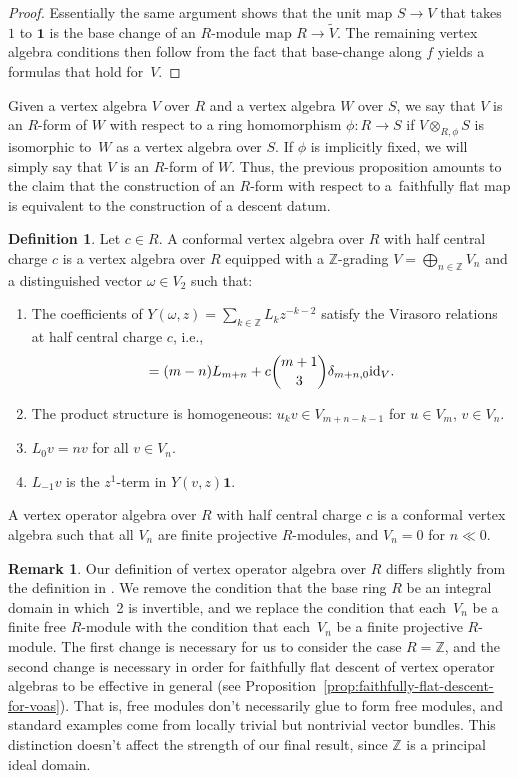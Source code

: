\documentclass[pdftex]{sigma}
\newcommand{\bZ}{\mathbb{Z}}
\newcommand{\unit}{\mathbf{1}}
\theoremstyle{definition}
\newtheorem{defn}[thm]{Definition}
\newtheorem{rem}[thm]{Remark}
\begin{document}
\begin{proof}
Essentially the same argument shows that the unit map $S \to V$ that takes~$1$ to $\unit$ is the base change of an $R$-module map $R \to \tilde{V}$. The remaining vertex algebra conditions then follow from the fact that base-change along $f$ yields a formulas that hold for~$V$.
\end{proof}

Given a vertex algebra $V$ over $R$ and a vertex algebra $W$ over $S$, we say that $V$ is an $R$-form of $W$ with respect to a ring homomorphism $\phi\colon R \to S$ if $V \otimes_{R,\phi} S$ is isomorphic to~$W$ as a vertex algebra over $S$. If $\phi$ is implicitly fixed, we will simply say that $V$ is an $R$-form of $W$. Thus, the previous proposition amounts to the claim that the construction of an $R$-form with respect to a~faithfully flat map is equivalent to the construction of a descent datum.

\begin{defn}
Let $c\in R$. A conformal vertex algebra over $R$ with half central charge $c$ is a vertex algebra over $R$ equipped with a $\bZ$-grading $V = \bigoplus_{n \in \bZ} V_n$ and a distinguished vector $\omega \in V_2$ such that:
\begin{enumerate}\itemsep=0pt
\item The coefficients of $Y(\omega,z) = \sum\limits_{k \in \bZ} L_k z^{-k-2}$ satisfy the Virasoro relations at half central charge $c$, i.e.,
\begin{gather*} [L_m, L_n] = (m-n)L_{m+n} + c \binom{m+1}{3} \delta_{m+n,0} {\rm id}_V. \end{gather*}
\item The product structure is homogeneous: $u_k v \in V_{m+n-k-1}$ for $u \in V_m$, $v \in V_n$.
\item $L_0 v = nv$ for all $v \in V_n$.
\item $L_{-1}v$ is the $z^1$-term in $Y(v,z)\unit$.
\end{enumerate}
A vertex operator algebra over $R$ with half central charge $c$ is a conformal vertex algebra such that all $V_n$ are finite projective $R$-modules, and $V_n = 0$ for $n \ll 0$.
\end{defn}

\begin{rem}Our definition of vertex operator algebra over $R$ differs slightly from the defi\-nition in \cite{DR13}. We remove the condition that the base ring $R$ be an integral domain in which~2 is invertible, and we replace the condition that each~$V_n$ be a finite free $R$-module with the condition that each~$V_n$ be a finite projective $R$-module. The first change is necessary for us to consider the case $R = \bZ$, and the second change is necessary in order for faithfully flat descent of vertex operator algebras to be effective in general (see Proposition~\ref{prop:faithfully-flat-descent-for-voas}). That is, free modules don't necessarily glue to form free modules, and standard examples come from locally trivial but nontrivial vector bundles. This distinction doesn't affect the strength of our final result, since $\bZ$ is a principal ideal domain.
\end{rem}
\end{document}
